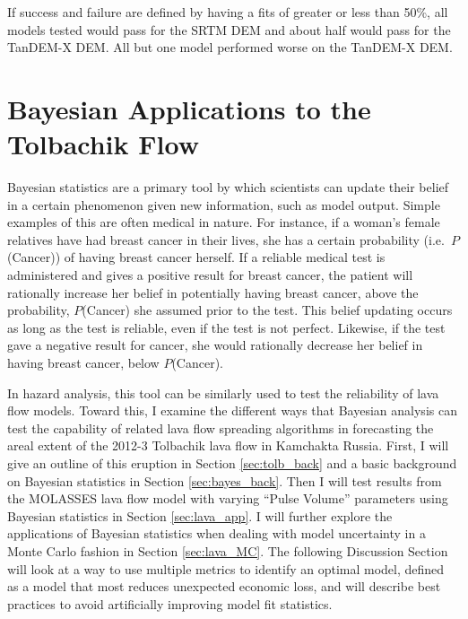 \documentclass[12pt,letter]{article}
\begin{document}
		If success and failure are defined by having a fits of greater or less than 50\%, all models tested would pass for the SRTM DEM and about half would pass for the TanDEM-X DEM. All but one model performed worse on the TanDEM-X DEM.


\section{Bayesian Applications to the Tolbachik Flow}
	Bayesian statistics are a primary tool by which scientists can update their belief in a certain phenomenon given new information, such as model output. Simple examples of this are often medical in nature. For instance, if a woman's female relatives have had breast cancer in their lives, she has a certain probability (i.e.~$P$(Cancer)) of having breast cancer herself. If a reliable medical test is administered and gives a positive result for breast cancer, the patient will rationally increase her belief in potentially having breast cancer, above the probability, $P$(Cancer) she assumed prior to the test. This belief updating occurs as long as the test is reliable, even if the test is not perfect. Likewise, if the test gave a negative result for cancer, she would rationally decrease her belief in having breast cancer, below $P$(Cancer).

	In hazard analysis, this tool can be similarly used to test the reliability of lava flow models. Toward this, I examine the different ways that Bayesian analysis can test the capability of related lava flow spreading algorithms in forecasting the areal extent of the 2012-3 Tolbachik lava flow in Kamchakta Russia. First, I will give an outline of this eruption in Section \ref{sec:tolb_back} and a basic background on Bayesian statistics in Section \ref{sec:bayes_back}. Then I will test results from the MOLASSES lava flow model with varying ``Pulse Volume'' parameters using Bayesian statistics in Section \ref{sec:lava_app}. I will further explore the applications of Bayesian statistics when dealing with model uncertainty in a Monte Carlo fashion in Section \ref{sec:lava_MC}. The following Discussion Section will look at a way to use multiple metrics to identify an optimal model, defined as a model that most reduces unexpected economic loss, and will describe best practices to avoid artificially improving model fit statistics.
\end{document}
